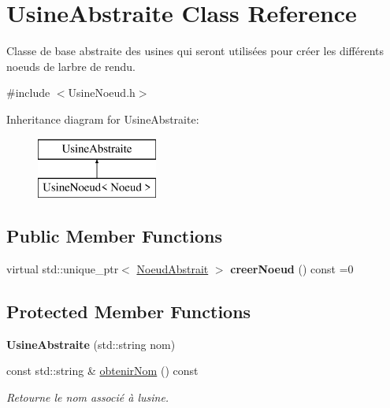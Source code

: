 \hypertarget{class_usine_abstraite}{}\section{Usine\+Abstraite Class Reference}
\label{class_usine_abstraite}


Classe de base abstraite des usines qui seront utilisées pour créer les différents noeuds de l\textquotesingle{}arbre de rendu.  




{\ttfamily \#include $<$Usine\+Noeud.\+h$>$}

Inheritance diagram for Usine\+Abstraite\+:\begin{figure}[H]
\begin{center}
\leavevmode
\includegraphics[height=2.000000cm]{class_usine_abstraite}
\end{center}
\end{figure}
\subsection*{Public Member Functions}
\begin{DoxyCompactItemize}
\item 
\hypertarget{class_usine_abstraite_a53ba5c378846bf00d838272d58b014f7}{}virtual std\+::unique\+\_\+ptr$<$ \hyperlink{class_noeud_abstrait}{Noeud\+Abstrait} $>$ {\bfseries creer\+Noeud} () const  =0\label{class_usine_abstraite_a53ba5c378846bf00d838272d58b014f7}

\end{DoxyCompactItemize}
\subsection*{Protected Member Functions}
\begin{DoxyCompactItemize}
\item 
\hypertarget{class_usine_abstraite_a6a5dc32968aa9a7ddd052c2b8f694447}{}{\bfseries Usine\+Abstraite} (std\+::string nom)\label{class_usine_abstraite_a6a5dc32968aa9a7ddd052c2b8f694447}

\item 
\hypertarget{group__inf2990_gad39877ea31a37efc3e58708193155c3c}{}const std\+::string \& \hyperlink{group__inf2990_gad39877ea31a37efc3e58708193155c3c}{obtenir\+Nom} () const \label{group__inf2990_gad39877ea31a37efc3e58708193155c3c}

\begin{DoxyCompactList}\small\item\em Retourne le nom associé à l\textquotesingle{}usine. \end{DoxyCompactList}\end{DoxyCompactItemize}


